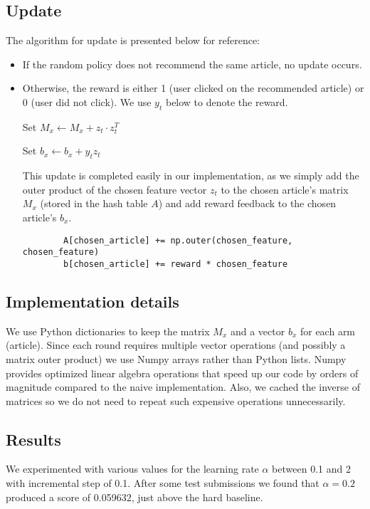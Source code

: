 \documentclass[a4paper, 11pt]{article}
\begin{document}
\subsection{Update}

The algorithm for update is presented below for reference:
\newline

\begin{itemize}
    \item If the random policy does not recommend the same article, no update occurs.

    \item Otherwise, the reward is either 1 (user clicked on the recommended article) or 0 (user did not click). We use $y_t$ below to denote the reward.



    Set $M_x \leftarrow M_x + z_t \cdot z_t^T$

    Set $b_x \leftarrow b_x + y_t z_t$

    This update is completed easily in our implementation, as we simply add the outer product of the chosen feature vector $z_t$ to the chosen article's matrix $M_x$ (stored in the hash table $A$) and add reward feedback to the chosen article's $b_x$.
    \begin{verbatim}
        A[chosen_article] += np.outer(chosen_feature, chosen_feature)
        b[chosen_article] += reward * chosen_feature
    \end{verbatim}
\end{itemize}

\subsection{Implementation details}

We use Python dictionaries to keep the matrix $M_x$ and a vector $b_x$ for each arm (article). Since each round requires multiple vector operations (and possibly a matrix outer product) we use Numpy arrays rather than Python lists. Numpy provides optimized linear algebra operations that speed up our code by orders of magnitude compared to the naive implementation. Also, we cached the inverse of matrices so we do not need to repeat such expensive operations unnecessarily.

\subsection{Results}

We experimented with various values for the learning rate $\alpha$ between 0.1 and 2 with incremental step of 0.1. After some test submissions we found that $\alpha = 0.2$ produced a score of 0.059632, just above the hard baseline.
\end{document}

